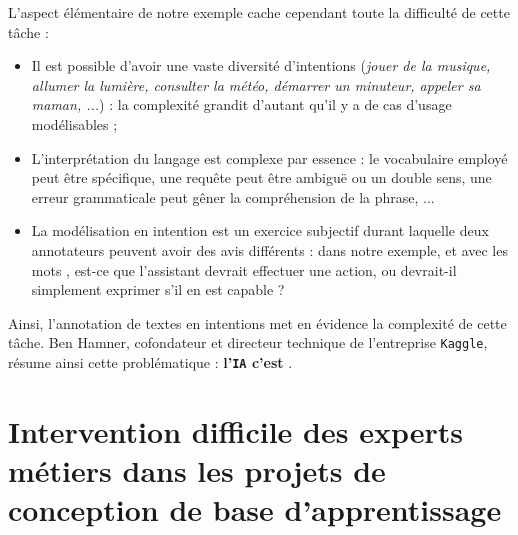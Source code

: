 		L'aspect élémentaire de notre exemple cache cependant toute la difficulté de cette tâche :
		\begin{itemize}
			\item Il est possible d'avoir une vaste diversité d'intentions (\textit{jouer de la musique, allumer la lumière, consulter la météo, démarrer un minuteur, appeler sa maman, ...}) : la complexité grandit d'autant qu'il y a de cas d'usage modélisables ;
			\item L'interprétation du langage est complexe par essence : le vocabulaire employé peut être spécifique, une requête peut être ambiguë ou un double sens, une erreur grammaticale peut gêner la compréhension de la phrase, ...
			\item La modélisation en intention est un exercice subjectif durant laquelle deux annotateurs peuvent avoir des avis différents : dans notre exemple, et avec les mots , est-ce que l'assistant devrait effectuer une action, ou devrait-il simplement exprimer s'il en est capable ?
		\end{itemize}
		
		Ainsi, l'annotation de textes en intentions met en évidence la complexité de cette tâche.
		Ben Hamner, cofondateur et directeur technique de l'entreprise \texttt{Kaggle}, résume ainsi cette problématique : \textbf{l'\texttt{IA} c'est }.
		
		
	\section*{Intervention difficile des experts métiers dans les projets de conception de base d'apprentissage}
		
